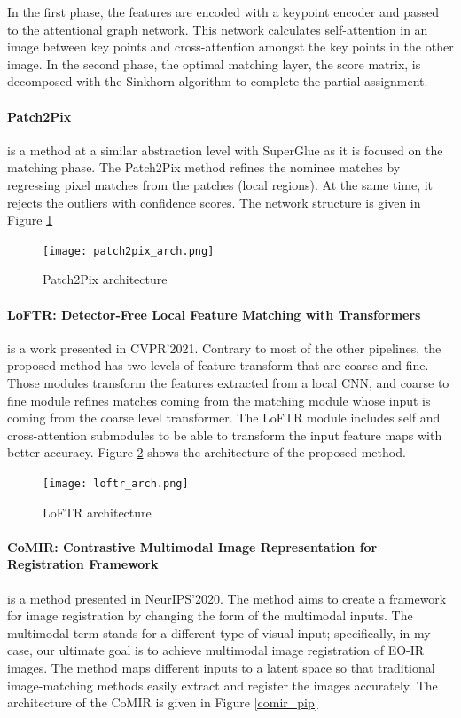 \documentclass[letterpaper,12pt]{article}
\begin{document}
In the first phase, the features are encoded with a keypoint encoder and passed to the attentional graph network. This network calculates self-attention in an image between key points and cross-attention amongst the key points in the other image. In the second phase, the optimal matching layer, the score matrix, is decomposed with the Sinkhorn algorithm to complete the partial assignment.
\paragraph{Patch2Pix}
\cite{ZhouCVPRpatch2pix} is a method at a similar abstraction level with SuperGlue \cite{sarlin20superglue} as it is focused on the matching phase. The Patch2Pix method refines the nominee matches by regressing pixel matches from the patches (local regions). At the same time, it rejects the outliers with confidence scores. The network structure is given in Figure \ref{patch2pix}


\begin{figure}[H]
    \centering
    \texttt{[image: patch2pix\_arch.png]}
    \caption{Patch2Pix architecture}
    \label{patch2pix}
\end{figure} 


\paragraph{LoFTR: Detector-Free Local Feature Matching with Transformers}
\cite{sun2021loftr} is a work presented in CVPR'2021. Contrary to most of the other pipelines, the proposed method has two levels of feature transform that are coarse and fine. Those modules transform the features extracted from a local CNN, and coarse to fine module refines matches coming from the matching module whose input is coming from the coarse level transformer. The LoFTR module includes self and cross-attention submodules to be able to transform the input feature maps with better accuracy. Figure \ref{loftr} shows the architecture of the proposed method.

\begin{figure}[H]
    \centering
    \texttt{[image: loftr\_arch.png]}
    \caption{LoFTR architecture}
    \label{loftr}
\end{figure} 

\paragraph{CoMIR: Contrastive Multimodal Image Representation for Registration Framework} \cite{pielawski2020comir} is a method presented in NeurIPS'2020. The method aims to create a framework for image registration by changing the form of the multimodal inputs. The multimodal term stands for a different type of visual input; specifically, in my case, our ultimate goal is to achieve multimodal image registration of EO-IR images. The method maps different inputs to a latent space so that traditional image-matching methods easily extract and register the images accurately. The architecture of the CoMIR is given in Figure \ref{comir_pip}
\end{document}
